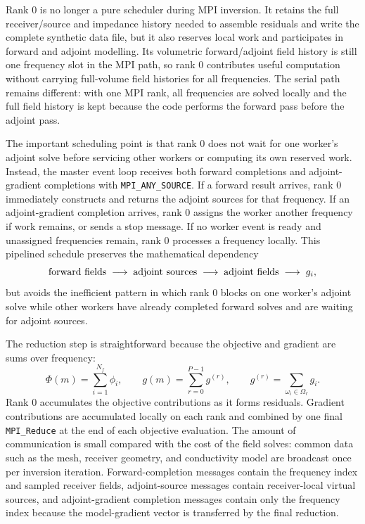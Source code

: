 \documentclass{article}
\begin{document}
Rank 0 is no longer a pure scheduler during MPI inversion. It retains the full receiver/source and impedance history needed to assemble residuals and write the complete synthetic data file, but it also reserves local work and participates in forward and adjoint modelling. Its volumetric forward/adjoint field history is still one frequency slot in the MPI path, so rank 0 contributes useful computation without carrying full-volume field histories for all frequencies. The serial path remains different: with one MPI rank, all frequencies are solved locally and the full field history is kept because the code performs the forward pass before the adjoint pass.

The important scheduling point is that rank 0 does not wait for one worker's adjoint solve before servicing other workers or computing its own reserved work. Instead, the master event loop receives both forward completions and adjoint-gradient completions with \texttt{MPI\_ANY\_SOURCE}. If a forward result arrives, rank 0 immediately constructs and returns the adjoint sources for that frequency. If an adjoint-gradient completion arrives, rank 0 assigns the worker another frequency if work remains, or sends a stop message. If no worker event is ready and unassigned frequencies remain, rank 0 processes a frequency locally. This pipelined schedule preserves the mathematical dependency
\[
  \hbox{forward fields} \;\longrightarrow\; \hbox{adjoint sources} \;\longrightarrow\; \hbox{adjoint fields} \;\longrightarrow\; g_i ,
\]
but avoids the inefficient pattern in which rank 0 blocks on one worker's adjoint solve while other workers have already completed forward solves and are waiting for adjoint sources.

The reduction step is straightforward because the objective and gradient are sums over frequency:
\begin{equation}
  \Phi(m) = \sum_{i=1}^{N_f}\phi_i, \qquad
  g(m) = \sum_{r=0}^{P-1}g^{(r)}, \qquad
  g^{(r)}=\sum_{\omega_i\in\Omega_r}g_i .
\end{equation}
Rank 0 accumulates the objective contributions as it forms residuals. Gradient contributions are accumulated locally on each rank and combined by one final \texttt{MPI\_Reduce} at the end of each objective evaluation. The amount of communication is small compared with the cost of the field solves: common data such as the mesh, receiver geometry, and conductivity model are broadcast once per inversion iteration. Forward-completion messages contain the frequency index and sampled receiver fields, adjoint-source messages contain receiver-local virtual sources, and adjoint-gradient completion messages contain only the frequency index because the model-gradient vector is transferred by the final reduction.
\end{document}
